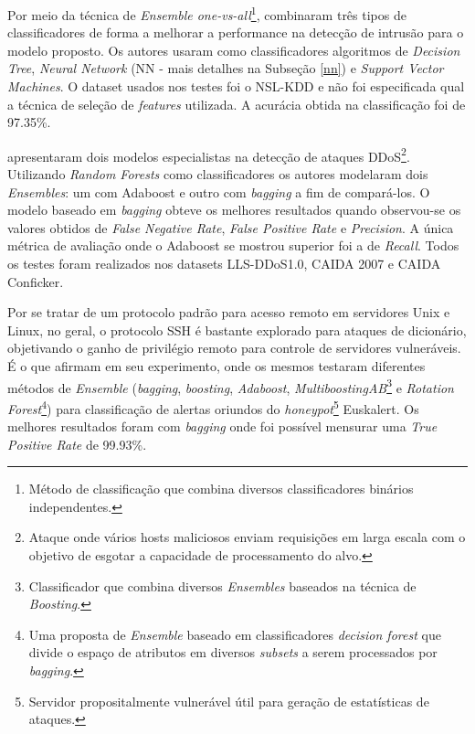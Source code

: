 Por meio da técnica de \textit{Ensemble one-vs-all}\footnote{Método de classificação que combina diversos classificadores binários independentes.},  combinaram três tipos de classificadores de forma a melhorar a performance na detecção de intrusão para o modelo proposto. Os autores usaram como classificadores algoritmos de \textit{Decision Tree}, \textit{Neural Network} (NN - mais detalhes na Subseção \ref{nn}) e \textit{Support Vector Machines}. O dataset usados nos testes foi o NSL-KDD e não foi especificada qual a técnica de seleção de \textit{features} utilizada. A acurácia obtida na classificação foi de 97.35\%.

 apresentaram dois modelos especialistas na detecção de ataques DDoS\footnote{Ataque onde vários hosts maliciosos enviam requisições em larga escala com o objetivo de esgotar a capacidade de processamento do alvo.}. Utilizando \textit{Random Forests} como classificadores os autores modelaram dois \textit{Ensembles}: um com Adaboost e outro com \textit{bagging} a fim de compará-los. O modelo baseado em \textit{bagging} obteve os melhores resultados quando observou-se os valores obtidos de \textit{False Negative Rate}, \textit{False Positive Rate} e \textit{Precision}. A única métrica de avaliação onde o Adaboost se mostrou superior foi a de \textit{Recall}. Todos os testes foram realizados nos datasets LLS-DDoS1.0, CAIDA 2007 e CAIDA Conficker. 

Por se tratar de um protocolo padrão para acesso remoto em servidores Unix e Linux, no geral, o protocolo SSH é bastante explorado para ataques de dicionário, objetivando o ganho de privilégio remoto para controle de servidores vulneráveis. É o que afirmam  em seu experimento, onde os mesmos testaram diferentes métodos de \textit{Ensemble} (\textit{bagging}, \textit{boosting}, \textit{Adaboost}, \textit{MultiboostingAB}\footnote{Classificador que combina diversos \textit{Ensembles} baseados na técnica de \textit{Boosting}.} e \textit{Rotation Forest}\footnote{Uma proposta de \textit{Ensemble} baseado em classificadores \textit{decision forest} que divide o espaço de atributos em diversos \textit{subsets} a serem processados por \textit{bagging}.}) para classificação de alertas oriundos do \textit{honeypot}\footnote{Servidor propositalmente vulnerável útil para geração de estatísticas de ataques.} Euskalert. Os melhores resultados foram com \textit{bagging} onde foi possível mensurar uma \textit{True Positive Rate} de 99.93\%.

